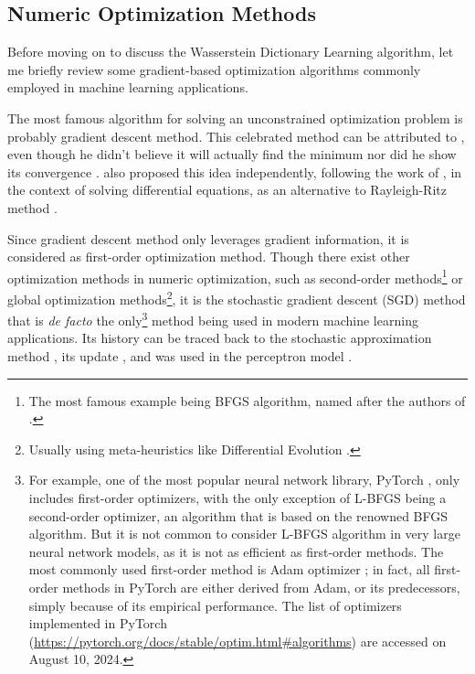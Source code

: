 


\subsection{Numeric Optimization Methods}\label{subsec:numeric-optimization-methods}

Before moving on to discuss the Wasserstein Dictionary Learning algorithm,
let me briefly review some gradient-based optimization algorithms commonly employed in machine learning applications.

The most famous algorithm for solving an unconstrained optimization problem is probably gradient descent method.
This celebrated method can be attributed to \citet{cauchy1847}, even though he didn't
believe it will actually find the minimum nor did he show its convergence \citep{lemarechal2012}.
\citet{hadamard1908} also proposed this idea independently, following the work of \citet{hilbert1900},
in the context of solving differential equations,
as an alternative to Rayleigh-Ritz method \citep{rayleigh1896,ritz1909,courant1943}.

Since gradient descent method only leverages gradient information, it is considered as first-order optimization method.
Though there exist other optimization methods in numeric optimization,
such as second-order methods\footnote{
  The most famous example being BFGS algorithm,
  named after the authors of \citet{broyden1970,fletcher1970,goldfarb1970,shanno1970}.
} or global optimization methods\footnote{
  Usually using meta-heuristics like Differential Evolution \citep{storn1997}.
},
it is the stochastic gradient descent (SGD) method that is \textit{de facto} the only\footnote{
  For example, one of the most popular neural network library, PyTorch \citep{paszke2017},
  only includes first-order optimizers, with the only exception of L-BFGS \citep{liu1989} being a second-order optimizer,
  an algorithm that is based on the renowned BFGS algorithm.
  But it is not common to consider L-BFGS algorithm in very large neural network models,
  as it is not as efficient as first-order methods.
  The most commonly used first-order method is Adam optimizer \citep{kingma2015};
  in fact, all first-order methods in PyTorch are either derived from Adam, or its predecessors,
  simply because of its empirical performance.
  The list of optimizers implemented in PyTorch (\url{https://pytorch.org/docs/stable/optim.html\#algorithms})
  are accessed on August 10, 2024.
}
method being used in modern machine learning applications.
Its history can be traced back to the stochastic approximation method \citep{robbins1951},
its update \citep{kiefer1952},
and was used in the perceptron model \citep{rosenblatt1958}.

